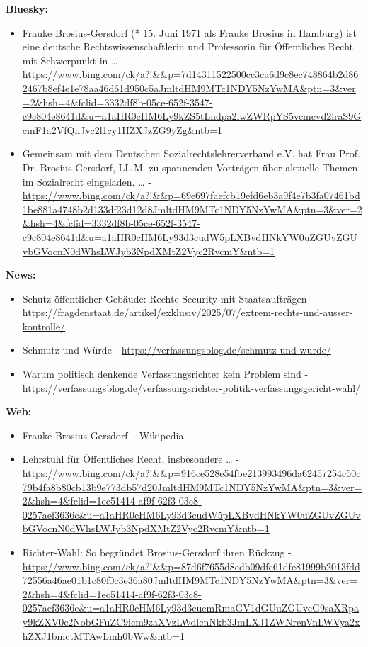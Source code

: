 \documentclass[12pt,a4paper]{article}
\begin{document}
\textbf{Bluesky:}
\begin{itemize}
\item Frauke Brosius-Gersdorf (* 15. Juni 1971 als Frauke Brosius in Hamburg) ist eine deutsche Rechtswissenschaftlerin und Professorin für Öffentliches Recht mit Schwerpunkt in … - \url{https://www.bing.com/ck/a?!&&p=7d14311522500cc3ca6d9c8ec748864b2d862467b8ef4e1e78aa46d61d950c5aJmltdHM9MTc1NDY5NzYwMA&ptn=3&ver=2&hsh=4&fclid=3332df8b-05ce-652f-3547-c9c804e8641d&u=a1aHR0cHM6Ly9kZS5tLndpa2lwZWRpYS5vcmcvd2lraS9GcmF1a2VfQnJvc2l1cy1HZXJzZG9yZg&ntb=1}
\item Gemeinsam mit dem Deutschen Sozialrechtslehrerverband e.V. hat Frau Prof. Dr. Brosius-Gersdorf, LL.M. zu spannenden Vorträgen über aktuelle Themen im Sozialrecht eingeladen. … - \url{https://www.bing.com/ck/a?!&&p=69e697faefcb19efd6eb3a9f4e7b3fa07461bd1be881a4748b2d133df23d12d8JmltdHM9MTc1NDY5NzYwMA&ptn=3&ver=2&hsh=4&fclid=3332df8b-05ce-652f-3547-c9c804e8641d&u=a1aHR0cHM6Ly93d3cudW5pLXBvdHNkYW0uZGUvZGUvbGVocnN0dWhsLWJyb3NpdXMtZ2Vyc2RvcmY&ntb=1}
\end{itemize}

\textbf{News:}
\begin{itemize}
\item Schutz öffentlicher Gebäude: Rechte Security mit Staatsaufträgen - \url{https://fragdenstaat.de/artikel/exklusiv/2025/07/extrem-rechts-und-ausser-kontrolle/}
\item Schmutz und Würde - \url{https://verfassungsblog.de/schmutz-und-wurde/}
\item Warum politisch denkende Verfassungsrichter kein Problem sind - \url{https://verfassungsblog.de/verfassungsrichter-politik-verfassungsgericht-wahl/}
\end{itemize}

\textbf{Web:}
\begin{itemize}
\item Frauke Brosius-Gersdorf – Wikipedia
\item Lehrstuhl für Öffentliches Recht, insbesondere … - \url{https://www.bing.com/ck/a?!&&p=916ce528e54fbe213993496da62457254c50c79b4fa8b80cb13b9e773db57d20JmltdHM9MTc1NDY5NzYwMA&ptn=3&ver=2&hsh=4&fclid=1ec51414-af9f-62f3-03c8-0257aef3636c&u=a1aHR0cHM6Ly93d3cudW5pLXBvdHNkYW0uZGUvZGUvbGVocnN0dWhsLWJyb3NpdXMtZ2Vyc2RvcmY&ntb=1}
\item Richter-Wahl: So begründet Brosius-Gersdorf ihren Rückzug - \url{https://www.bing.com/ck/a?!&&p=87d6f7655d8edb09dfc61dfe81999b2013fdd72556a46ae01b1c80f0c3e36a80JmltdHM9MTc1NDY5NzYwMA&ptn=3&ver=2&hsh=4&fclid=1ec51414-af9f-62f3-03c8-0257aef3636c&u=a1aHR0cHM6Ly93d3cuemRmaGV1dGUuZGUvcG9saXRpay9kZXV0c2NobGFuZC9icm9zaXVzLWdlcnNkb3JmLXJ1ZWNrenVnLWVya2xhZXJ1bmctMTAwLmh0bWw&ntb=1}
\end{itemize}
\end{document}
